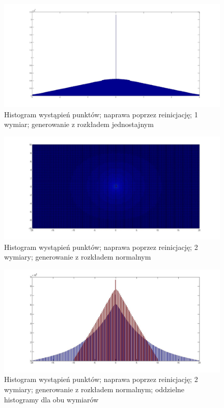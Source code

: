 \documentclass{mini}
\begin{document}
\begin{figure}[H]
\centering
\includegraphics[width=\textwidth]{ri_j_20M_1__3_3}
\caption{Histogram wystąpień punktów; naprawa poprzez reinicjację; 1 wymiar; generowanie z rozkładem jednostajnym}
\label{bladzenie:reinicjacja1dj}
\end{figure}

\begin{figure}[H]
\centering
\includegraphics[width=\textwidth]{ri_n_10M_2__20_20__10_10_4}
\caption{Histogram wystąpień punktów; naprawa poprzez reinicjację; 2 wymiary; generowanie z rozkładem normalnym}
\end{figure}

\begin{figure}[H]
\centering
\includegraphics[width=\textwidth]{ri_n_10M_2__20_20__10_10_4_1D}
\caption{Histogram wystąpień punktów; naprawa poprzez reinicjację; 2 wymiary; generowanie z rozkładem normalnym; oddzielne histogramy dla obu wymiarów}
\label{bladzenie:reinicjacja2ds}
\end{figure}
\end{document}

